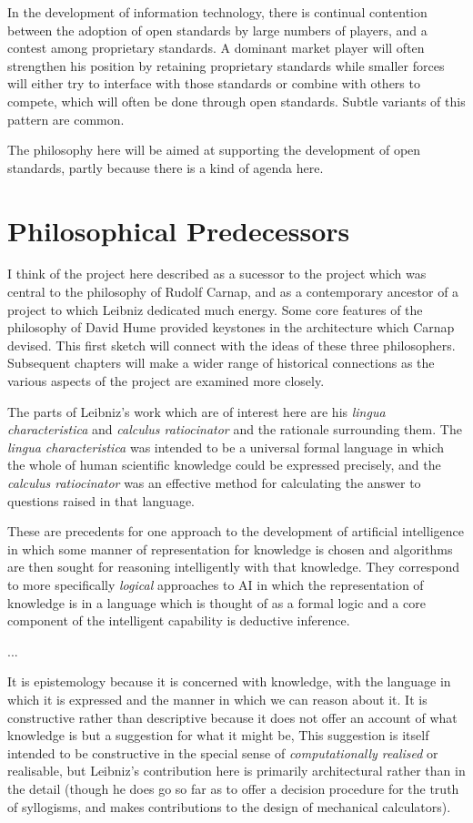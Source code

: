 In the development of information technology, there is continual contention between
the adoption of open standards by large numbers of players, and a contest among
proprietary standards.
A dominant market player will often strengthen his position by retaining proprietary
standards while smaller forces will either try to interface with those standards
or combine with others to compete, which will often be done through open standards.
Subtle variants of this pattern are common.

The philosophy here will be aimed at supporting the development of open standards,
partly because there is a kind of agenda here.

\section{Philosophical Predecessors}

I think of the project here described as a sucessor to the project which
was central to the philosophy of Rudolf Carnap, and as a contemporary ancestor
of a project to which Leibniz dedicated much energy.
Some core features of the philosophy of David Hume provided keystones in
the architecture which Carnap devised.
This first sketch will connect with the ideas of these three philosophers.
Subsequent chapters will make a wider range of historical connections
as the various aspects of the project are examined more closely.

The parts of Leibniz's work which are of interest here are his
\emph{lingua characteristica} and \emph{calculus ratiocinator} and the
rationale surrounding them.
The \emph{lingua characteristica} was intended to be a universal formal language
in which the whole of human scientific knowledge could be expressed precisely,
and the \emph{calculus ratiocinator} was an effective method for calculating
the answer to questions raised in that language.

These are precedents for one approach to the development of artificial intelligence
in which some manner of representation for knowledge is chosen and algorithms
are then sought for reasoning intelligently with that knowledge. 
They correspond to more specifically \emph{logical} approaches to AI
in which the representation of knowledge is in a language which is thought
of as a formal logic and a core component of the intelligent capability is
deductive inference.

...

It is epistemology because it is concerned with knowledge, with the language
in which it is expressed and the manner in which we can reason about it.
It is constructive rather than descriptive because it does not offer an account
of what knowledge is but a suggestion for what it might be,
This suggestion is itself intended to be constructive in the special sense
of \emph{computationally realised} or realisable, but Leibniz's contribution here is
primarily architectural rather than in the detail (though he does go so far as to
offer a decision procedure for the truth of syllogisms, and makes contributions
to the design of mechanical calculators).

